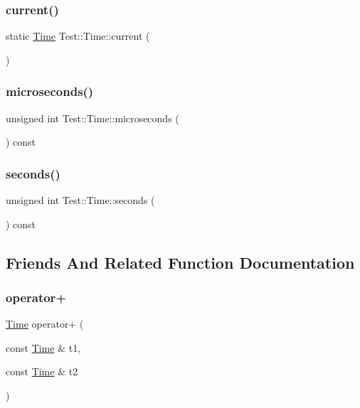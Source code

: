 \subsubsection{\texorpdfstring{current()}{current()}}
{\footnotesize\ttfamily static \mbox{\hyperlink{class_test_1_1_time}{Time}} Test\+::\+Time\+::current (\begin{DoxyParamCaption}{ }\end{DoxyParamCaption})\hspace{0.3cm}{\ttfamily [static]}}

\mbox{\label{class_test_1_1_time_a49a77156512509bea4bb49b614a5ecc8}} 
\subsubsection{\texorpdfstring{microseconds()}{microseconds()}}
{\footnotesize\ttfamily unsigned int Test\+::\+Time\+::microseconds (\begin{DoxyParamCaption}{ }\end{DoxyParamCaption}) const}

\mbox{\label{class_test_1_1_time_a75a6145c4502fc9c1a3f5171c6536b07}} 
\subsubsection{\texorpdfstring{seconds()}{seconds()}}
{\footnotesize\ttfamily unsigned int Test\+::\+Time\+::seconds (\begin{DoxyParamCaption}{ }\end{DoxyParamCaption}) const}



\subsection{Friends And Related Function Documentation}
\mbox{\label{class_test_1_1_time_ae2e555aa5b5c51e44b576d8baf48a2cd}} 
\subsubsection{\texorpdfstring{operator+}{operator+}}
{\footnotesize\ttfamily \mbox{\hyperlink{class_test_1_1_time}{Time}} operator+ (\begin{DoxyParamCaption}\item[{const \mbox{\hyperlink{class_test_1_1_time}{Time}} \&}]{t1,  }\item[{const \mbox{\hyperlink{class_test_1_1_time}{Time}} \&}]{t2 }\end{DoxyParamCaption})\hspace{0.3cm}{\ttfamily [friend]}}

